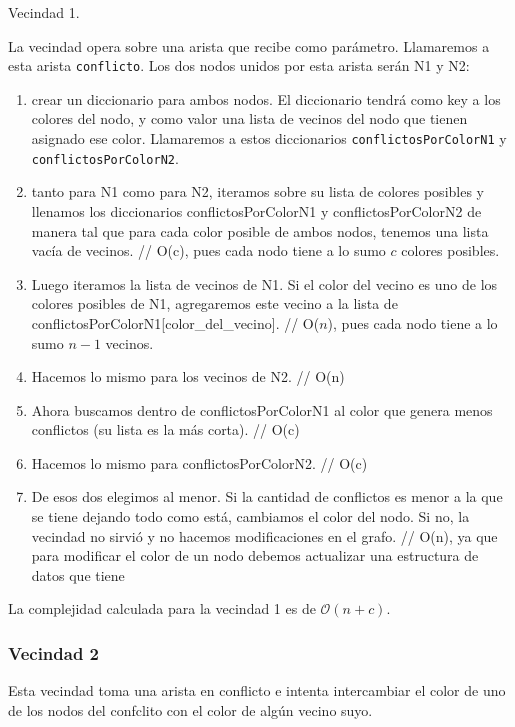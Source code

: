 \begin{algorithm}[H]
\caption{Vecindad 1.}
\label{vecindad1 pseudocode}
La vecindad opera sobre una arista que recibe como parámetro. Llamaremos a esta arista \texttt{conflicto}. Los dos nodos unidos por esta arista serán N1 y N2:
\begin{enumerate}
 \item crear un diccionario para ambos nodos. El diccionario tendrá como key a los colores del nodo, y como valor una lista de vecinos del nodo que tienen asignado ese color. Llamaremos a estos diccionarios \texttt{conflictosPorColorN1} y \texttt{conflictosPorColorN2}.
 \item tanto para N1 como para N2, iteramos sobre su lista de colores posibles y llenamos los diccionarios conflictosPorColorN1 y conflictosPorColorN2 de manera tal que para cada color posible de ambos nodos, tenemos una lista vacía de vecinos.  // O(c), pues cada nodo tiene a lo sumo $c$ colores posibles.
 \item Luego iteramos la lista de vecinos de N1. Si el color del vecino es uno de los colores posibles de N1, agregaremos este vecino a la lista de conflictosPorColorN1[color_del_vecino]. // O($n$), pues cada nodo tiene a lo sumo $n-1$ vecinos.
 \item Hacemos lo mismo para los vecinos de N2. // O(n)
 \item Ahora buscamos dentro de conflictosPorColorN1 al color que genera menos conflictos (su lista es la más corta). // O(c)
 \item Hacemos lo mismo para conflictosPorColorN2. // O(c)
 \item De esos dos elegimos al menor. Si la cantidad de conflictos es menor a la que se tiene dejando todo como está, cambiamos el color del nodo. Si no, la vecindad no sirvió y no hacemos modificaciones en el grafo. // O(n), ya que para modificar el color de un nodo debemos actualizar una estructura de datos que tiene 
\end{enumerate}
\end{algorithm}


La complejidad calculada para la vecindad 1 es de $\mathcal{O}(n + c)$.


\subsubsection{Vecindad 2}

Esta vecindad toma una arista en conflicto e intenta intercambiar el color de uno de los nodos del confclito con el color de algún vecino suyo.

